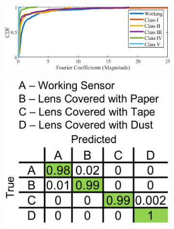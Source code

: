 \begin{figure}%
	\begin{subfigure}[t]{0.41\textwidth}
		\includegraphics[width=\linewidth]{figures/2-PIR-Fault/all-5-combined/CDF_FFT.png}
		\caption{}
		\label{fig:cdf_combined_all}
	\end{subfigure}\hfill%
	\begin{subfigure}[b]{0.16\textwidth}
		\centering
		\includegraphics[width=\linewidth]{figures/classification/LensDefects/confusion-matrix-lensdefects.png}
		\caption{}
		\label{fig:finegrained_classification_results}
	\end{subfigure}%
	\begin{subfigure}[t]{0.41\textwidth}
		\centering

\end{subfigure}
\end{figure}
